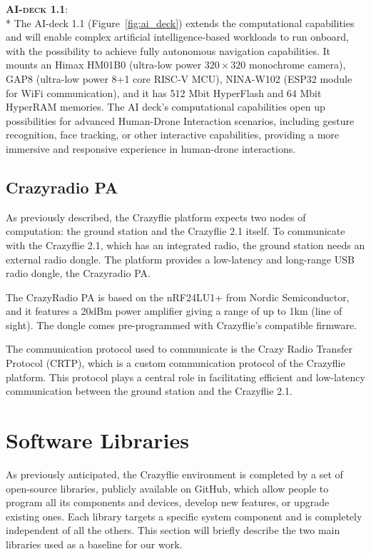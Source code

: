 {\bfseries \scshape AI-deck 1.1}\label{deck:ai}:\\*
The AI-deck 1.1 (Figure~\ref{fig:ai_deck}) extends the computational capabilities and will enable complex artificial intelligence-based workloads to run onboard, with the possibility to achieve fully autonomous navigation capabilities. 
It mounts an Himax HM01B0 (ultra-low power \(320 \times 320\) monochrome camera), GAP8 (ultra-low power 8+1 core RISC-V MCU), NINA-W102 (ESP32 module for WiFi communication), and it has 512 Mbit HyperFlash and 64 Mbit HyperRAM memories. 
The AI deck's computational capabilities open up possibilities for advanced Human-Drone Interaction scenarios, including gesture recognition, face tracking, or other interactive capabilities, providing a more immersive and responsive experience in human-drone interactions.

\subsection{Crazyradio PA}\label{subsec:crazyradio}
As previously described, the Crazyflie platform expects two nodes of computation: the ground station and the Crazyflie 2.1 itself. 
To communicate with the Crazyflie 2.1, which has an integrated radio, the ground station needs an external radio dongle. 
The platform provides a low-latency and long-range USB radio dongle, the Crazyradio PA.

The CrazyRadio PA is based on the nRF24LU1+ from Nordic Semiconductor, and it features a 20dBm power amplifier giving a range of up to 1km (line of sight).
The dongle comes pre-programmed with Crazyflie's compatible firmware.

The communication protocol used to communicate is the Crazy Radio Transfer Protocol (CRTP), which is a custom communication protocol of the Crazyflie platform. 
This protocol plays a central role in facilitating efficient and low-latency communication between the ground station and the Crazyflie 2.1.


\section{Software Libraries}\label{sec:software_libraries}
As previously anticipated, the Crazyflie environment is completed by a set of open-source libraries, 
publicly available on GitHub, which allow people to program all its components and devices, 
develop new features, or upgrade existing ones. Each library targets a specific system component and is completely independent of all the others. 
This section will briefly describe the two main libraries used as a baseline for our work. 


